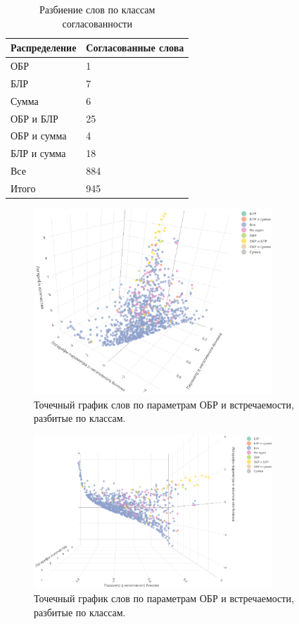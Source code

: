 \documentclass[12pt, specialist, subf, substylefile = spbu_report.rtx]{disser}
\begin{document}
	\begin{table}[t]
		\centering
		\caption{Разбиение слов по классам согласованности}
		\begin{tabular}{l|l}
			Распределение 		   & Согласованные слова \\
			\hline
			ОБР                    & 1               \\
			БЛР                    & 7               \\
			Сумма                  & 6              \\
			ОБР и БЛР              & 25              \\
			ОБР и сумма            & 4              \\
			БЛР и сумма            & 18              \\
			Все                    & 884             \\
			\hline
			Итого                  & 945          
		\end{tabular}
		\label{tab:wordclass}
	\end{table}

	\begin{figure}[!ht]
		\centering
		\includegraphics[width = 0.8\textwidth]{wordclassmain}
		\caption{Точечный график слов по параметрам ОБР и встречаемости, разбитые по классам.}
		\label{img:wordclassmain}
	\end{figure}
	
	\begin{figure}[!ht]
		\centering
		\includegraphics[width = 0.8\textwidth]{wordclassup}
		\caption{Точечный график слов по параметрам ОБР и встречаемости, разбитые по классам.}
		\label{img:wordclassup}
	\end{figure}
\end{document}
